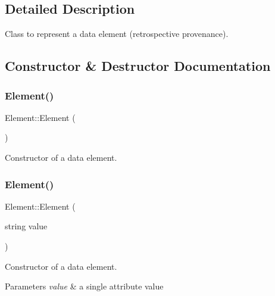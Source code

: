 \subsection{Detailed Description}
Class to represent a data element (retrospective provenance). 

\subsection{Constructor \& Destructor Documentation}
\mbox{\label{classElement_ab0d0e20be9a36ae676202db753faeec9}} 
\subsubsection{\texorpdfstring{Element()}{Element()}\hspace{0.1cm}{\footnotesize\ttfamily [1/3]}}
{\footnotesize\ttfamily Element\+::\+Element (\begin{DoxyParamCaption}{ }\end{DoxyParamCaption})\hspace{0.3cm}{\ttfamily [inline]}}

Constructor of a data element. \mbox{\label{classElement_ac5749aba608dc8bfb68c7e996d159cb7}} 
\subsubsection{\texorpdfstring{Element()}{Element()}\hspace{0.1cm}{\footnotesize\ttfamily [2/3]}}
{\footnotesize\ttfamily Element\+::\+Element (\begin{DoxyParamCaption}\item[{string}]{value }\end{DoxyParamCaption})\hspace{0.3cm}{\ttfamily [inline]}}

Constructor of a data element. 
\begin{DoxyParams}{Parameters}
{\em value} & a single attribute value \\
\hline
\end{DoxyParams}
\mbox{\label{classElement_a628516fcaf54458e35ffbcb3a9082e99}} 
